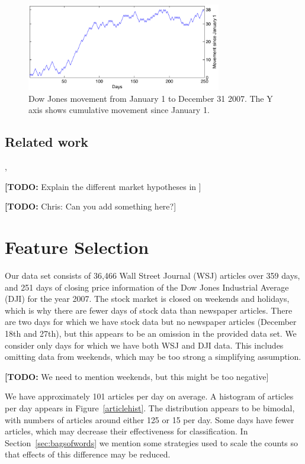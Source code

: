 \documentclass[10pt, twocolumn]{article}
\def\TODO#1{\noindent\textbf{[TODO:} #1]}
\begin{document}
\begin{figure}
\includegraphics[width=8.5cm]{experiments/dj_performance.pdf}
\caption{Dow Jones movement from January 1 to December 31 2007. The Y axis shows cumulative movement since January 1.}
\label{fig:dj-preformance}
\end{figure}

\subsection{Related work}
\cite{twitter}, \cite{mlstockmarket}




\TODO{Explain the different market hypotheses in \cite{mlstockmarket}}

\TODO{Chris: Can you add something here?}

\section{Feature Selection}
\label{sec:features}

Our data set consists of 36,466 Wall Street Journal (WSJ) articles over 359 days, and 251 days of closing price information of the Dow Jones Industrial Average (DJI) for the year 2007. The stock market is closed on weekends and holidays, which is why there are fewer days of stock data than newspaper articles. There are two days for which we have stock data but no newspaper articles (December 18th and 27th), but this appears to be an omission in the provided data set. We consider only days for which we have both WSJ and DJI data. This includes omitting data from weekends, which may be too strong a simplifying assumption.

\TODO{We need to mention weekends, but this might be too negative}

We have approximately 101 articles per day on average. A histogram of articles per day appears in Figure~\ref{articlehist}. The distribution appears to be bimodal, with numbers of articles around either 125 or 15 per day. Some days have fewer articles, which may decrease their effectiveness for classification. In Section~\ref{sec:bagsofwords} we mention some strategies used to scale the counts so that effects of this difference may be reduced.
\end{document}
